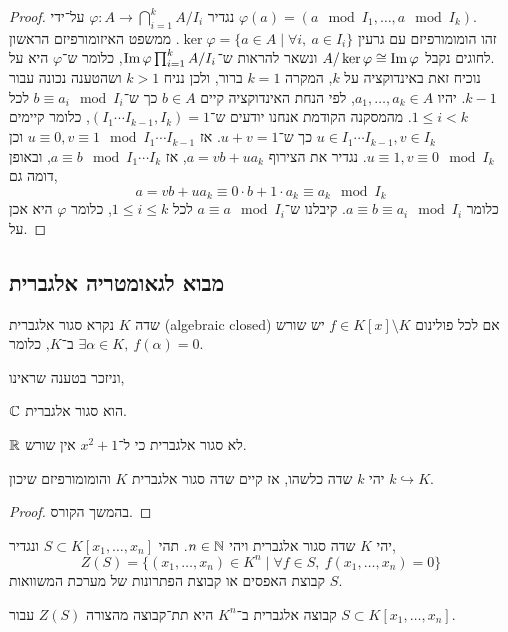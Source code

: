 \begin{proof}
	נגדיר $\varphi : A \to \bigcap_{i = 1}^k A / I_i$ על־ידי $\varphi(a) = (a \mod I_1, \ldots, a \mod I_k)$. \\
	זהו הומומורפיזם עם גרעין $\ker \varphi = \{ a \in A \mid \forall i,\ a \in I_i \}$.
	ממשפט האיזומורפיזם הראשון לחוגים נקבל $A / \ker \varphi \cong \operatorname{Im} \varphi$ ונשאר להראות ש־$\operatorname{Im} \varphi \prod_{i = 1}^k A / I_i$, כלומר ש־$\varphi$ היא על. \\
	נוכיח זאת באינדוקציה על $k$, המקרה $k = 1$ ברור, ולכן נניח $k > 1$ ושהטענה נכונה עבור $k - 1$.
	יהיו $a_1, \ldots, a_k \in A$, לפי הנחת האינדוקציה קיים $b \in A$ כך ש־$b \equiv a_i \mod I_i$ לכל $1 \le i < k$.
	מהמסקנה הקודמת אנחנו יודעים ש־$(I_1 \cdots I_{k - 1}, I_k) = 1$, כלומר קיימים $u \in I_1 \cdots I_{k - 1}, v \in I_k$ כך ש־$u + v = 1$.
	אז $u \equiv 0, v \equiv 1 \mod I_1 \cdots I_{k - 1}$ וכן $u \equiv 1, v \equiv 0 \mod I_k$.
	נגדיר את הצירוף $a = v b + u a_k$, אז $a \equiv b \mod I_1 \cdots I_k$, ובאופן דומה גם,
	\[
		a
		= v b + u a_k
		\equiv 0 \cdot b + 1 \cdot a_k
		\equiv a_k \mod I_k
	\]
	כלומר $a \equiv b \equiv a_i \mod I_i$. קיבלנו ש־$a \equiv a \mod I_i$ לכל $1 \le i \le k$, כלומר $\varphi$ היא אכן על.
\end{proof}

\subsection{מבוא לגאומטריה אלגברית}
\begin{definition}
	שדה $K$ נקרא סגור אלגברית (algebraic closed) אם לכל פולינום $f \in K[x] \setminus K$ יש שורש ב־$K$, כלומר $\exists \alpha \in K,\ f(\alpha) = 0$.
\end{definition}
וניזכר בטענה שראינו,
\begin{theorem}
	$\mathbb{C}$ הוא סגור אלגברית.
\end{theorem}
\begin{example}
	$\mathbb{R}$ לא סגור אלגברית כי ל־$x^2 + 1$ אין שורש.
\end{example}
\begin{theorem}
	יהי $k$ שדה כלשהו, אז קיים שדה סגור אלגברית $K$ והומומורפיזם שיכון $k \hookrightarrow K$.
\end{theorem}
\begin{proof}
	בהמשך הקורס.
\end{proof}
\begin{definition}
	יהי $K$ שדה סגור אלגברית ויהי $n \in \mathbb{N}$.
	תהי $S \subset K[x_1, \ldots, x_n]$ ונגדיר,
	\[
		Z(S)
		= \{ (x_1, \ldots, x_n) \in K^n \mid \forall f \in S,\ f(x_1, \ldots, x_n) = 0 \}
	\]
	קבוצת האפסים או קבוצת הפתרונות של מערכת המשוואות $S$.
\end{definition}
\begin{definition}
	קבוצה אלגברית ב־$K^n$ היא תת־קבוצה מהצורה $Z(S)$ עבור $S \subset K[x_1, \ldots, x_n]$.
\end{definition}

